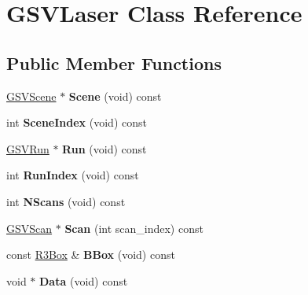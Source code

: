 \hypertarget{class_g_s_v_laser}{}\section{G\+S\+V\+Laser Class Reference}
\label{class_g_s_v_laser}
\subsection*{Public Member Functions}
\begin{DoxyCompactItemize}
\item 
\hyperlink{class_g_s_v_scene}{G\+S\+V\+Scene} $\ast$ {\bfseries Scene} (void) const \hypertarget{class_g_s_v_laser_ad6ca5d4debbb566aace5e0984f4b4e90}{}\label{class_g_s_v_laser_ad6ca5d4debbb566aace5e0984f4b4e90}

\item 
int {\bfseries Scene\+Index} (void) const \hypertarget{class_g_s_v_laser_ab690dbba65778f6155fcaf3d8d92508d}{}\label{class_g_s_v_laser_ab690dbba65778f6155fcaf3d8d92508d}

\item 
\hyperlink{class_g_s_v_run}{G\+S\+V\+Run} $\ast$ {\bfseries Run} (void) const \hypertarget{class_g_s_v_laser_ac737daa29053573e47a4a72ca6343101}{}\label{class_g_s_v_laser_ac737daa29053573e47a4a72ca6343101}

\item 
int {\bfseries Run\+Index} (void) const \hypertarget{class_g_s_v_laser_a28a36cb626d5159db5c33f5ed4e5ca3f}{}\label{class_g_s_v_laser_a28a36cb626d5159db5c33f5ed4e5ca3f}

\item 
int {\bfseries N\+Scans} (void) const \hypertarget{class_g_s_v_laser_a547909ad5391671d3406b8ee907e752f}{}\label{class_g_s_v_laser_a547909ad5391671d3406b8ee907e752f}

\item 
\hyperlink{class_g_s_v_scan}{G\+S\+V\+Scan} $\ast$ {\bfseries Scan} (int scan\+\_\+index) const \hypertarget{class_g_s_v_laser_ac261f4662dbb1ed590c9e50259ea4dc6}{}\label{class_g_s_v_laser_ac261f4662dbb1ed590c9e50259ea4dc6}

\item 
const \hyperlink{class_r3_box}{R3\+Box} \& {\bfseries B\+Box} (void) const \hypertarget{class_g_s_v_laser_af4cd484d511867f8473858b013101eaa}{}\label{class_g_s_v_laser_af4cd484d511867f8473858b013101eaa}

\item 
void $\ast$ {\bfseries Data} (void) const \hypertarget{class_g_s_v_laser_ad0216ddfa9e09c056bd85063919d8a8e}{}\label{class_g_s_v_laser_ad0216ddfa9e09c056bd85063919d8a8e}


\end{DoxyCompactItemize}
